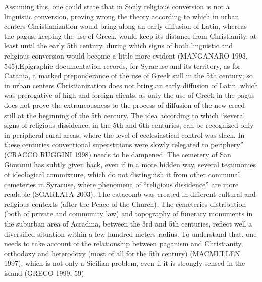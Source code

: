 \documentclass[amsthm,ebook]{saparticle}
\begin{document}
Assuming this, one could state that in Sicily religious conversion is not a linguistic conversion, proving wrong the theory according to which in urban centers Christianization would bring along an early diffusion of Latin, whereas the pagus, keeping the use of Greek, would keep its distance from Christianity, at least until the early 5th century, during which signs of both linguistic and religious conversion would become a little more evident (MANGANARO 1993, 545).Epigraphic documentation records, for Syracuse and its territory, as for Catania, a marked preponderance of the use of Greek still in the 5th century; so in urban centers Christianization does not bring an early diffusion of Latin, which was prerogative of high and foreign clients, as only the use of Greek in the pagus does not prove the extraneousness to the process of diffusion of the new creed still at the beginning of the 5th century. The idea according
to which “several signs of religious dissidence, in the 5th and 6th centuries, can be recognized only in peripheral rural areas, where the level of ecclesiastical control was slack. In these centuries conventional superstitions were slowly relegated to periphery” (CRACCO RUGGINI 1998) needs to be dampened.
The cemetery of San Giovanni has subtly given back, even if in a more hidden way, several testimonies of ideological commixture, which do not distinguish it from other communal cemeteries in Syracuse, where phenomena of “religious dissidence” are more readable (SGARLATA 2003). The catacomb was created in different cultural and religious contexts (after the Peace of the Church). The cemeteries distribution (both of private and community law) and topography of funerary monuments in the suburban area of Acradina, between the 3rd and 5th centuries, reflect well a diversified situation within a few hundred meters radius. To understand that, one needs to take account of the relationship between paganism and Christianity, orthodoxy and heterodoxy (most of all for the 5th century) (MACMULLEN 1997), which is not only a Sicilian problem, even if it is strongly sensed in the island (GRECO 1999, 59)



\end{document}
